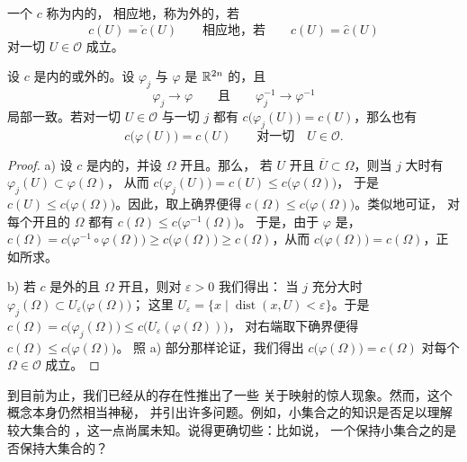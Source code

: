 \begin{definition}\label{def:inner-outer-regular-capacity}
一个\trCapacity{} $c$ 称为内\trRegular{}的，%
相应地，称为外\trRegular{}的，若
\[
c(U)=\check{c}(U)\qquad\text{相应地，若}\qquad c(U)=\hat{c}(U)
\]
对一切 $U\in\mathcal{O}$ 成立。
\end{definition}

\begin{proposition}\label{prop:regular-capacity-homeomorphism}
设\trCapacity{} $c$ 是内\trRegular{}的或外\trRegular{}的。设 $\varphi_j$ 与 $\varphi$%
是 $\mathbb{R}^{2n}$ 的\trHomeomorphism，且
\[
\varphi_j\to\varphi\qquad\text{且}\qquad\varphi_j^{-1}\to\varphi^{-1}
\]
局部一致。若对一切 $U\in\mathcal{O}$ 与一切 $j$ 都有%
$c\bigl(\varphi_j(U)\bigr)=c(U)$，那么也有
\[
c\bigl(\varphi(U)\bigr)=c(U)\qquad\text{对一切}\quad U\in\mathcal{O}.
\]
\end{proposition}

\begin{proof}
a) 设 $c$ 是内\trRegular{}的，并设 $\Omega$ 开且\trBounded。那么，%
若 $U$ 开且 $\overline{U}\subset\Omega$，则当 $j$ 大时有%
$\varphi_j(U)\subset\varphi(\Omega)$，%
从而 $c\bigl(\varphi_j(U)\bigr)=c(U)\le c\bigl(\varphi(\Omega)\bigr)$，%
于是 $c(U)\le c\bigl(\varphi(\Omega)\bigr)$。因此，取上确界便得%
$c(\Omega)\le c\bigl(\varphi(\Omega)\bigr)$。类似地可证，%
对每个开且\trBounded{}的 $\Omega$ 都有 $c(\Omega)\le c\bigl(\varphi^{-1}(\Omega)\bigr)$。%
于是，由于 $\varphi$ 是\trHomeomorphism，%
$c(\Omega)=c\bigl(\varphi^{-1}\circ\varphi(\Omega)\bigr)\ge c\bigl(\varphi(\Omega)\bigr)
\ge c(\Omega)$，从而 $c\bigl(\varphi(\Omega)\bigr)=c(\Omega)$，正如所求。

b) 若 $c$ 是外\trRegular{}的且 $\Omega$ 开且\trBounded，则对 $\varepsilon>0$ 我们得出：%
当 $j$ 充分大时 $\varphi_j(\Omega)\subset U_{\varepsilon}\bigl(\varphi(\Omega)\bigr)$；%
这里 $U_{\varepsilon}=\{x\mid\operatorname{dist}(x,U)<\varepsilon\}$。于是%
$c(\Omega)=c\bigl(\varphi_j(\Omega)\bigr)\le c\bigl(U_{\varepsilon}(\varphi(\Omega))\bigr)$，%
对右端取下确界便得 $c(\Omega)\le c\bigl(\varphi(\Omega)\bigr)$。%
照 a) 部分那样论证，我们得出 $c\bigl(\varphi(\Omega)\bigr)=c(\Omega)$%
对每个 $\Omega\in\mathcal{O}$ 成立。
\end{proof}

到目前为止，我们已经从\trSymplecticCapacity{}的存在性推出了一些%
关于\trSymplectic{}映射的惊人现象。然而，这个概念本身仍然相当神秘，%
并引出许多问题。例如，小集合之\trCapacity{}的知识是否足以理解较大集合的%
\trCapacity，这一点尚属未知。说得更确切些：比如说，%
一个保持小集合之\trCapacity{}的\trHomeomorphism{}是否保持大集合的\trCapacity？

